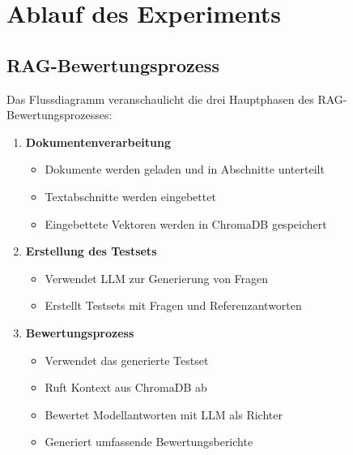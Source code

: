 \chapter{Ablauf des Experiments}

\section{RAG-Bewertungsprozess}

Das Flussdiagramm veranschaulicht die drei Hauptphasen des RAG-Bewertungsprozesses:

\begin{enumerate}
    \item \textbf{Dokumentenverarbeitung}
    \begin{itemize}
        \item Dokumente werden geladen und in Abschnitte unterteilt
        \item Textabschnitte werden eingebettet
        \item Eingebettete Vektoren werden in ChromaDB gespeichert
    \end{itemize}
    
    \item \textbf{Erstellung des Testsets}
    \begin{itemize}
        \item Verwendet LLM zur Generierung von Fragen
        \item Erstellt Testsets mit Fragen und Referenzantworten
    \end{itemize}
    
    \item \textbf{Bewertungsprozess}
    \begin{itemize}
        \item Verwendet das generierte Testset
        \item Ruft Kontext aus ChromaDB ab
        \item Bewertet Modellantworten mit LLM als Richter
        \item Generiert umfassende Bewertungsberichte
    \end{itemize}
\end{enumerate}

